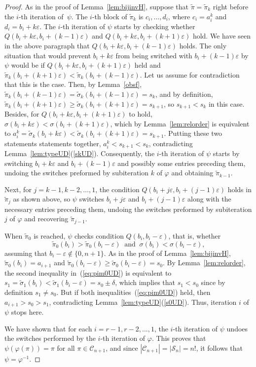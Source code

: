 \documentclass[11pt]{amsart}
\newcommand\beq{\begin{equation}}
\newcommand\eeq{\end{equation}}
\renewcommand\S{\mathcal S}
\newcommand\C{\mathcal C}
\newcommand\wt{\widetilde}
\newcommand\bij{\varphi}
\newcommand\inv{\psi}
\newcommand\eps{\varepsilon}
\newcommand\sigm{\wt\sigma}
\newcommand\pim{\wt\pi}
\begin{document}
\begin{proof}
As in the proof of Lemma~\ref{lem:bijinvH}, suppose that $\pim=\pim_k$ right before the $i$-th iteration of~$\inv$. The $i$-th block of $\pim_k$ is $c_i,\dots,d_i$,
where $c_i=a_i^k$ and $d_i=b_i+k\eps$.
The $i$-th iteration of $\inv$ starts by checking whether $Q(b_i+k\eps,b_i+(k{-}1)\eps)$ and $Q(b_i+k\eps,b_i+(k{+}1)\eps)$ hold. We have seen in the above paragraph that $Q(b_i+k\eps,b_i+(k{-}1)\eps)$ holds.
The only situation that would prevent $b_i+k\eps$ from being switched with $b_i+(k{-}1)\eps$ by $\inv$ would be if $Q(b_i+k\eps,b_i+(k{+}1)\eps)$ held and $\pim_k(b_i+(k{+}1)\eps)<\pim_k(b_i+(k{-}1)\eps)$.
Let us assume for contradiction that this is the case. Then, by Lemma~\ref{obsf}, $\pim_k(b_i+(k{-}1)\eps)=\sigm_k(b_i+(k{-}1)\eps)=s_k$, and by definition, $\pim_k(b_i+(k{+}1)\eps)\ge \sigm_k(b_i+(k{+}1)\eps)=s_{k+1}$,
so $s_{k+1}<s_k$ in this case.
Besides, for $Q(b_i+k\eps,b_i+(k{+}1)\eps)$ to hold, $\sigma(b_i+k\eps)<\sigma(b_i+(k{+}1)\eps)$, which by Lemma~\ref{lem:relorder} is equivalent to $a_i^k=\sigm_k(b_i+k\eps)<\sigm_k(b_i+(k{+}1)\eps)=s_{k+1}$. Putting these two statements
statements together, $a_i^k<s_{k+1}<s_k$, contradicting Lemma~\ref{lem:typeUD}(\ref{skUD}).
Consequently, the $i$-th iteration of $\inv$ starts by switching $b_i+k\eps$ and $b_i+(k{-}1)\eps$ and possibly some entries preceding them, undoing the switches preformed by subiteration $k$ of $\bij$ and obtaining $\pim_{k-1}$.

Next, for $j=k{-}1,k{-}2,\dots,1$, the condition $Q(b_i+j\eps,b_i+(j{-}1)\eps)$ holds in $\pim_j$ as shown above, so $\inv$ switches $b_i+j\eps$ and $b_i+(j{-}1)\eps$ along with the necessary entries preceding them, undoing
the switches preformed by subiteration $j$ of $\bij$ and recovering $\pim_{j-1}$.

When $\pim_0$ is reached, $\inv$ checks condition $Q(b_i,b_i-\eps)$, that is, whether \beq\label{eq:pim0UD}\pim_0(b_i)>\pim_0(b_i-\eps)\ \textrm{ and }\ \sigma(b_i)<\sigma(b_i-\eps),\eeq assuming that $b_i-\eps\notin\{0,n+1\}$.
As in the proof of Lemma~\ref{lem:bijinvH}, $\pim_0(b_i)=a_{i+1}$ and $\pim_0(b_i-\eps)\ge\sigm_0(b_i-\eps)=s_0$.
By Lemma~\ref{lem:relorder}, the second inequality in~(\ref{eq:pim0UD})
is equivalent to $s_1=\sigm_1(b_i)<\sigm_1(b_i-\eps)=s_0\pm\delta$, which implies that $s_1<s_0$ since by definition $s_1\neq s_0$.
But if both inequalities~(\ref{eq:pim0UD}) held, then $a_{i+1}>s_0>s_1$, contradicting Lemma~\ref{lem:typeUD}(\ref{s0UD}). Thus, iteration $i$ of $\inv$ stops here.

We have shown that for each $i=r{-}1,r{-}2,\dots,1$, the $i$-th iteration of $\inv$ undoes the switches performed by the $i$-th iteration of $\bij$.
This proves that $\inv(\bij(\pi))=\pi$ for all $\pi\in\C_{n+1}$, and since $|\C_{n+1}|=|\S_n|=n!$, it follows that $\inv=\bij^{-1}$.
\end{proof}
\end{document}
